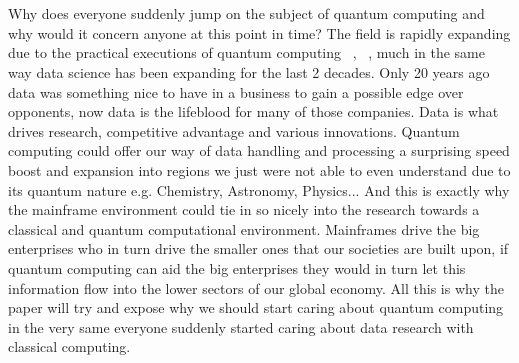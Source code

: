 
\chapter{}
\label{ch:inleiding}

Why does everyone suddenly jump on the subject of quantum computing and why would it concern anyone at this point in time? The field is rapidly expanding due to the practical executions of quantum computing ~\textcite{Google2019}, ~\textcite{IBM2019}, much in the same way data science has been expanding for the last 2 decades. Only 20 years ago data was something nice to have in a business to gain a possible edge over opponents, now data is the lifeblood for many of those companies. Data is what drives research, competitive advantage and various innovations. Quantum computing could offer our way of data handling and processing a surprising speed boost and expansion into regions we just were not able to even understand due to its quantum nature e.g. Chemistry, Astronomy, Physics...  And this is exactly why the mainframe environment could tie in so nicely into the research towards a classical and quantum computational environment. Mainframes drive the big enterprises who in turn drive the smaller ones that our societies are built upon, if quantum computing can aid the big enterprises they would in turn let this information flow into the lower sectors of our global economy. All this is why the paper will try and expose why we should start caring about quantum computing in the very same everyone suddenly started caring about data research with classical computing.


\section{}
\label{sec:probleemstelling}

